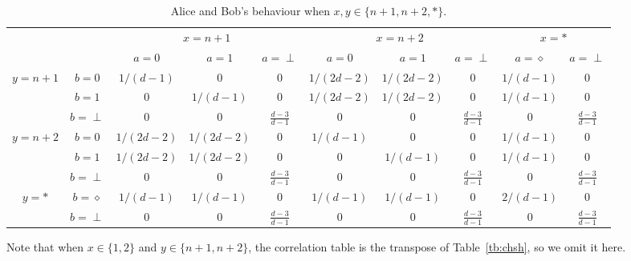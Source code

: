 \documentclass[11pt,letterpaper]{article}
\newcommand{\ket}[1]{|#1\rangle}
\newcommand{\bra}[1]{\langle#1|}
\newcommand{\1}{\mathbb{1}}
\theoremstyle{definition}
\begin{document}
\begin{table}[H]
\begin{center}
\begin{tabular}{|c|c||c|c|c|c|c|c|c|c|}
\hline
\multicolumn{2}{|c|}{} &
\multicolumn{3}{|c|}{$x=n+1$}&
\multicolumn{3}{|c|}{$x=n+2$}&
\multicolumn{2}{|c|}{$x=\ast$}\\
\cline{3-10}
\multicolumn{2}{|c|}{} &
$a = 0$ & $a=1$ & $a=\perp$ &
$a = 0$ & $a=1$ & $a=\perp$ &
$a = \diamond$ & $a = \perp$\\
\hline
\hline
\multirow{3}{*}{$y = n+1$} & $b=0$ & $1/(d-1)$ & $0$ & 0 
& $1/(2d-2)$ & $1/(2d-2)$ & 0 & $1/(d-1)$ & 0 \\
\cline{2-10}
&$b=1$ & 0 & $1/(d-1)$ & $0$ 
&  $1/(2d-2)$ & $1/(2d-2)$ & 0 &$1/(d-1)$ & 0 \\
\cline{2-10}
&$b=\perp$ & 0 & 0 & $\frac{d-3}{d-1}$ 
&  0 & 0 & \small $\frac{d-3}{d-1} $ &0 & \small $\frac{d-3}{d-1}$ \\
\hline
\multirow{3}{*}{$y = n+2$} & $b=0$ & $1/(2d-2)$ & $1/(2d-2)$ & 0 
& $1/(d-1)$ & $0$ & 0 & $1/(d-1)$ & 0 \\
\cline{2-10}
&$b=1$ & $1/(2d-2)$ & $1/(2d-2)$ & $0$ 
&  0 & $1/(d-1)$ & $0$ &$1/(d-1)$ & 0 \\
\cline{2-10}
&$b=\perp$ & 0 & 0 & \small $\frac{d-3}{d-1}$ 
&  0 & 0 & \small $\frac{d-3}{d-1} $ &0 &\small $\frac{d-3}{d-1}$ \\
\hline
\multirow{2}{*}{$y = \ast$} & $b=\diamond$ & $1/(d-1)$ & $1/(d-1)$ & 0 
& $1/(d-1)$ & $1/(d-1)$ & 0 & $2/(d-1)$ & 0 \\
\cline{2-10}
&$b=\perp$ & 0 & 0 & $\frac{d-3}{d-1}$ 
&  0 & 0 & \small $\frac{d-3}{d-1} $ &0 & \small $\frac{d-3}{d-1}$ \\
\hline
\end{tabular}
\end{center}
\caption{Alice and Bob's behaviour when $x ,y\in\{n+1,n+2, \ast\} $.}
\end{table}
Note that when $x \in \{1,2\}$ and $y \in \{n+1, n+2\}$, the correlation table is 
the transpose of Table~\ref{tb:chsh}, so we omit it here.
\end{document}

